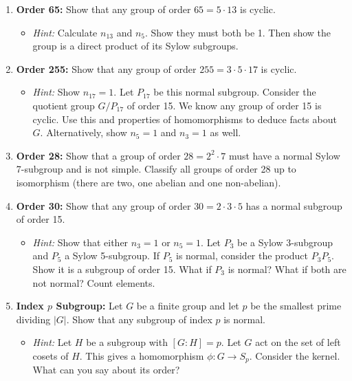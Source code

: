 \documentclass[12pt,a4paper]{article}
\theoremstyle{plain} %
\theoremstyle{definition} %
\theoremstyle{remark} %
\begin{document}
\begin{enumerate}
  \item \textbf{Order 65:} Show that any group of order $65=5 \cdot 13$ is cyclic.
  \begin{itemize}
    \item \textit{Hint:} Calculate $n_{13}$ and $n_5$. Show they must both be 1. Then show the group is a direct product of its Sylow subgroups.
  \end{itemize}

  \item \textbf{Order 255:} Show that any group of order $255 = 3 \cdot 5 \cdot 17$ is cyclic.
  \begin{itemize}
    \item \textit{Hint:} Show $n_{17}=1$. Let $P_{17}$ be this normal subgroup. Consider the quotient group $G/P_{17}$ of order 15. We know any group of order 15 is cyclic. Use this and properties of homomorphisms to deduce facts about $G$. Alternatively, show $n_5=1$ and $n_3=1$ as well.
  \end{itemize}

  \item \textbf{Order 28:} Show that a group of order $28=2^2 \cdot 7$ must have a normal Sylow 7-subgroup and is not simple. Classify all groups of order 28 up to isomorphism (there are two, one abelian and one non-abelian).

  \item \textbf{Order 30:} Show that any group of order $30=2 \cdot 3 \cdot 5$ has a normal subgroup of order 15.
  \begin{itemize}
    \item \textit{Hint:} Show that either $n_3=1$ or $n_5=1$. Let $P_3$ be a Sylow 3-subgroup and $P_5$ a Sylow 5-subgroup. If $P_5$ is normal, consider the product $P_3P_5$. Show it is a subgroup of order 15. What if $P_3$ is normal? What if both are not normal? Count elements.
  \end{itemize}
  
  \item \textbf{Index $p$ Subgroup:} Let $G$ be a finite group and let $p$ be the smallest prime dividing $|G|$. Show that any subgroup of index $p$ is normal.
  \begin{itemize}
    \item \textit{Hint:} Let $H$ be a subgroup with $[G:H]=p$. Let $G$ act on the set of left cosets of $H$. This gives a homomorphism $\phi: G \to S_p$. Consider the kernel. What can you say about its order?
  \end{itemize}

\end{enumerate}
\end{document}
